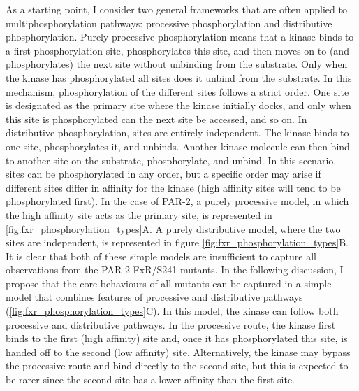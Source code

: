 \documentclass[12pt]{"report"}
\begin{document}
As a starting point, I consider two general frameworks that are often applied to multiphosphorylation pathways: processive phosphorylation and distributive phosphorylation. Purely processive phosphorylation means that a kinase binds to a first phosphorylation site, phosphorylates this site, and then moves on to (and phosphorylates) the next site without unbinding from the substrate. Only when the kinase has phosphorylated all sites does it unbind from the substrate. In this mechanism, phosphorylation of the different sites follows a strict order. One site is designated as the primary site where the kinase initially docks, and only when this site is phosphorylated can the next site be accessed, and so on. In distributive phosphorylation, sites are entirely independent. The kinase binds to one site, phosphorylates it, and unbinds. Another kinase molecule can then bind to another site on the substrate, phosphorylate, and unbind. In this scenario, sites can be phosphorylated in any order, but a specific order may arise if different sites differ in affinity for the kinase (high affinity sites will tend to be phosphorylated first). In the case of PAR-2, a purely processive model, in which the high affinity site acts as the primary site, is represented in \cref{fig:fxr_phosphorylation_types}A. A purely distributive model, where the two sites are independent, is represented in figure \cref{fig:fxr_phosphorylation_types}B. \\

It is clear that both of these simple models are insufficient to capture all observations from the PAR-2 FxR/S241 mutants. In the following discussion, I propose that the core behaviours of all mutants can be captured in a simple model that combines features of processive and distributive pathways (\cref{fig:fxr_phosphorylation_types}C). In this model, the kinase can follow both processive and distributive pathways. In the processive route, the kinase first binds to the first (high affinity) site and, once it has phosphorylated this site, is handed off to the second (low affinity) site. Alternatively, the kinase may bypass the processive route and bind directly to the second site, but this is expected to be rarer since the second site has a lower affinity than the first site. \\
\end{document}
